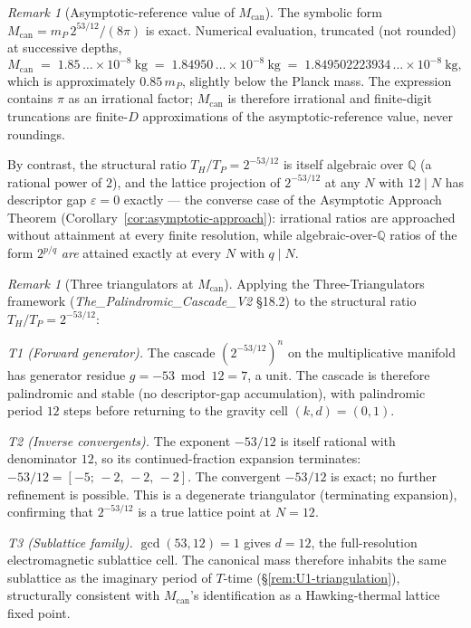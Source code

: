 \documentclass[11pt,a4paper]{article}
\theoremstyle{definition}
\theoremstyle{remark}
\newtheorem{remark}[theorem]{Remark}
\begin{document}
\begin{remark}[Asymptotic-reference value of $M_{\text{can}}$]\label{rem:canonical-asymptotic}
The symbolic form $M_{\text{can}} = m_{P}\,2^{53/12}/(8\pi)$ is exact. Numerical evaluation, truncated (not rounded) at successive depths,
\[
M_{\text{can}} \;=\; 1.85\,\ldots\times 10^{-8}~\text{kg} \;=\; 1.84950\,\ldots\times 10^{-8}~\text{kg} \;=\; 1.849502223934\,\ldots\times 10^{-8}~\text{kg},
\]
which is approximately $0.85\,m_{P}$, slightly below the Planck mass. The expression contains $\pi$ as an irrational factor; $M_{\text{can}}$ is therefore irrational and finite-digit truncations are finite-$D$ approximations of the asymptotic-reference value, never roundings.

By contrast, the structural ratio $T_{H}/T_{P} = 2^{-53/12}$ is itself algebraic over $\mathbb{Q}$ (a rational power of $2$), and the lattice projection of $2^{-53/12}$ at any $N$ with $12 \mid N$ has descriptor gap $\varepsilon = 0$ exactly --- the converse case of the Asymptotic Approach Theorem (Corollary~\ref{cor:asymptotic-approach}): irrational ratios are approached without attainment at every finite resolution, while algebraic-over-$\mathbb{Q}$ ratios of the form $2^{p/q}$ \emph{are} attained exactly at every $N$ with $q \mid N$.
\end{remark}

\begin{remark}[Three triangulators at $M_{\text{can}}$]\label{rem:canonical-triangulation}
Applying the Three-Triangulators framework (\textit{The\_Palindromic\_Cascade\_V2} \S18.2) to the structural ratio $T_{H}/T_{P} = 2^{-53/12}$:

\emph{T1 (Forward generator).} The cascade $(2^{-53/12})^{n}$ on the multiplicative manifold has generator residue $g = -53 \bmod 12 = 7$, a unit. The cascade is therefore palindromic and stable (no descriptor-gap accumulation), with palindromic period $12$ steps before returning to the gravity cell $(k,d) = (0,1)$.

\emph{T2 (Inverse convergents).} The exponent $-53/12$ is itself rational with denominator $12$, so its continued-fraction expansion terminates: $-53/12 = [-5;\,-2,\,-2,\,-2]$. The convergent $-53/12$ is exact; no further refinement is possible. This is a degenerate triangulator (terminating expansion), confirming that $2^{-53/12}$ is a true lattice point at $N = 12$.

\emph{T3 (Sublattice family).} $\gcd(53, 12) = 1$ gives $d = 12$, the full-resolution electromagnetic sublattice cell. The canonical mass therefore inhabits the same sublattice as the imaginary period of $T$-time (\S\ref{rem:U1-triangulation}), structurally consistent with $M_{\text{can}}$'s identification as a Hawking-thermal lattice fixed point.
\end{remark}
\end{document}
